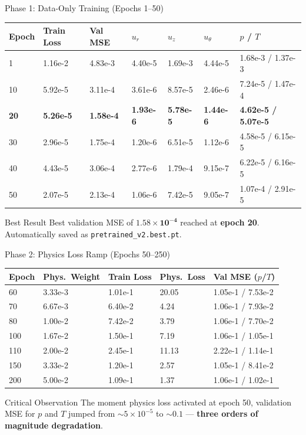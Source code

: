 \documentclass[aspectratio=169]{beamer}
\begin{document}
\begin{frame}{Phase 1: Data-Only Training (Epochs 1--50)}
\begin{table}
\centering
\small
\begin{tabular}{lllllll}
\toprule
Epoch & Train Loss & Val MSE & $u_r$ & $u_z$ & $u_\theta$ & $p$ / $T$ \\
\midrule
1 & 1.16e-2 & 4.83e-3 & 4.40e-5 & 1.69e-3 & 4.44e-5 & 1.68e-3 / 1.37e-3 \\
10 & 5.92e-5 & 3.11e-4 & 3.61e-6 & 8.57e-5 & 2.46e-6 & 7.24e-5 / 1.47e-4 \\
\textbf{20} & \textbf{5.26e-5} & \textbf{1.58e-4} & \textbf{1.93e-6} & \textbf{5.78e-5} & \textbf{1.44e-6} & \textbf{4.62e-5 / 5.07e-5} \\
30 & 2.96e-5 & 1.75e-4 & 1.20e-6 & 6.51e-5 & 1.12e-6 & 4.58e-5 / 6.15e-5 \\
40 & 4.43e-5 & 3.06e-4 & 2.77e-6 & 1.79e-4 & 9.15e-7 & 6.22e-5 / 6.16e-5 \\
50 & 2.07e-5 & 2.13e-4 & 1.06e-6 & 7.42e-5 & 9.05e-7 & 1.07e-4 / 2.91e-5 \\
\bottomrule
\end{tabular}
\end{table}

\begin{block}{Best Result}
Best validation MSE of $\mathbf{1.58\times10^{-4}}$ reached at \textbf{epoch 20}. Automatically saved as \texttt{pretrained\_v2.best.pt}.
\end{block}
\end{frame}

\begin{frame}{Phase 2: Physics Loss Ramp (Epochs 50--250)}
\begin{table}
\centering
\small
\begin{tabular}{lllll}
\toprule
Epoch & Phys.\ Weight & Train Loss & Phys.\ Loss & Val MSE ($p$/$T$) \\
\midrule
60 & 3.33e-3 & 1.01e-1 & 20.05 & 1.05e-1 / 7.53e-2 \\
70 & 6.67e-3 & 6.40e-2 & 4.24 & 1.06e-1 / 7.93e-2 \\
80 & 1.00e-2 & 7.42e-2 & 3.79 & 1.06e-1 / 7.70e-2 \\
100 & 1.67e-2 & 1.50e-1 & 7.19 & 1.06e-1 / 1.05e-1 \\
110 & 2.00e-2 & 2.45e-1 & 11.13 & 2.22e-1 / 1.14e-1 \\
150 & 3.33e-2 & 1.20e-1 & 2.57 & 1.05e-1 / 8.41e-2 \\
200 & 5.00e-2 & 1.09e-1 & 1.37 & 1.06e-1 / 1.02e-1 \\
\bottomrule
\end{tabular}
\end{table}

\begin{alertblock}{Critical Observation}
The moment physics loss activated at epoch 50, validation MSE for $p$ and $T$ jumped from $\sim5\times10^{-5}$ to $\sim0.1$ --- \textbf{three orders of magnitude degradation}.
\end{alertblock}
\end{frame}
\end{document}
